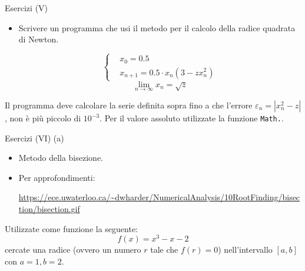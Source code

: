 \begin{frame}{Esercizi (V)}
  \begin{itemize}
    \item Scrivere un programma che usi il metodo per il calcolo della radice quadrata di Newton.
    
    \begin{equation*}
      \left\{\begin{aligned}
	  & x_0 = 0.5\\
	  & x_{n +1} = 0.5 \cdot {x_n} (3  - zx^2_n)
      \end{aligned}\right.
    \end{equation*}
    \begin{equation*}
     \lim_{n \to \infty} x_{n} = \sqrt{z}
    \end{equation*}
  \end{itemize}
  
  Il programma deve calcolare la serie definita sopra fino a che l'errore $\varepsilon_{n} = |x^{2}_{n} - z|$,
  non è più piccolo di $10^{-3}$. Per il valore assoluto utilizzate la funzione \texttt{Math.}.

\end{frame}

\begin{frame}{Esercizi (VI) (a)}
  \begin{itemize}
    \item Metodo della bisezione.
    \item Per approfondimenti:\newline
    \begin{scriptsize}
      \url{https://ece.uwaterloo.ca/~dwharder/NumericalAnalysis/10RootFinding/bisection/bisection.gif}
    \end{scriptsize}
  \end{itemize}

  Utilizzate come funzione la seguente:
  \begin{equation}
    f(x) = x^3 - x - 2
  \end{equation}
  cercate una radice (ovvero un numero $r$ tale che $f(r) = 0$) nell'intervallo $[a, b]$ con $a=1, b=2$.

\end{frame}

